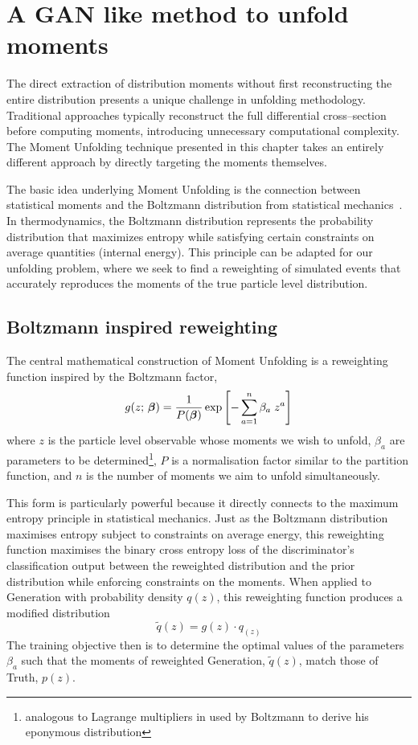 \section{A GAN like method to unfold moments}
    The direct extraction of distribution moments without first reconstructing the entire distribution presents a unique challenge in unfolding methodology.
    Traditional approaches typically reconstruct the full differential cross--section before computing moments, introducing unnecessary computational complexity.
    The Moment Unfolding technique presented in this chapter takes an entirely different approach by directly targeting the moments themselves.

    The basic idea underlying Moment Unfolding is the connection between statistical moments and the Boltzmann distribution from statistical mechanics~\cite{Boltzmann1978AbleitungLichttheorie, Sharp2015Translation1909}.
    In thermodynamics, the Boltzmann distribution represents the probability distribution that maximizes entropy while satisfying certain constraints on average quantities (internal energy). 
    This principle can be adapted for our unfolding problem, where we seek to find a reweighting of simulated events that accurately reproduces the moments of the true particle level distribution.
    \subsection{Boltzmann inspired reweighting}
        The central mathematical construction of Moment Unfolding is a reweighting function inspired by the Boltzmann factor,
        \[
            \label{eq:moment-generator}
            g(z;\,\vb*\beta) = \frac{1}{P(\vb*{\beta})} \exp\left[-\sum_{a=1}^n \beta_a \; z^a\right]
        \]
        where $z$ is the particle level observable whose moments we wish to unfold, $\beta_a$ are parameters to be determined\footnote{analogous to Lagrange multipliers in used by Boltzmann to derive his eponymous distribution}, $P$ is a normalisation factor similar to the partition function, and $n$ is the number of moments we aim to unfold simultaneously.

        This form is particularly powerful because it directly connects to the maximum entropy principle in statistical mechanics.
        Just as the Boltzmann distribution maximises entropy subject to constraints on average energy, this reweighting function maximises the binary cross entropy loss of the discriminator's classification output between the reweighted distribution and the prior distribution while enforcing constraints on the moments.
        When applied to Generation with probability density $q(z)$, this reweighting function produces a modified distribution
        \[
            \widetilde{q}(z) = g(z) \cdot q_(z)
        \]
        The training objective then is to determine the optimal values of the parameters $\beta_a$ such that the moments of reweighted Generation, $\widetilde{q}(z)$, match those of Truth, \(p(z)\).
    
